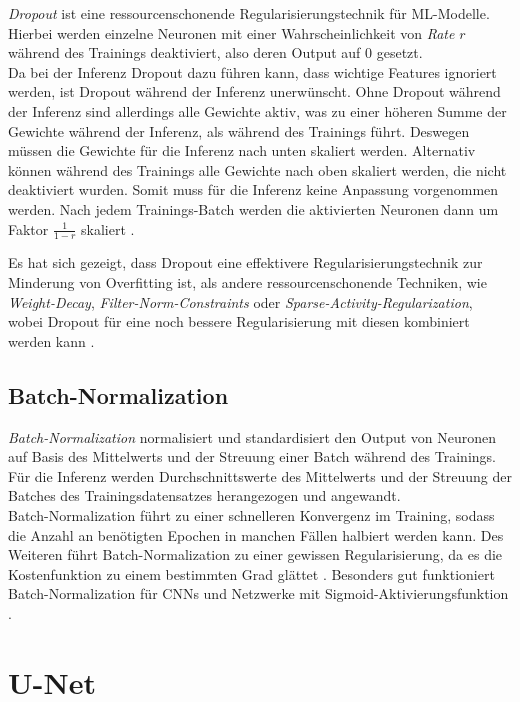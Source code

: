 \textit{Dropout} ist eine ressourcenschonende Regularisierungstechnik für \ac{ML}-Modelle. 
Hierbei werden einzelne Neuronen mit einer Wahrscheinlichkeit von \textit{Rate} $r$ während des Trainings 
deaktiviert, also deren Output auf $0$ gesetzt.\\ 
Da bei der Inferenz Dropout dazu führen kann, 
dass wichtige Features ignoriert werden, ist Dropout während der Inferenz unerwünscht. Ohne Dropout während der 
Inferenz sind allerdings alle Gewichte aktiv, was zu einer höheren Summe der Gewichte während der Inferenz, 
als während des Trainings führt. Deswegen müssen die Gewichte für die Inferenz nach unten skaliert werden. 
Alternativ können während des Trainings alle Gewichte nach oben skaliert werden, die nicht deaktiviert wurden. 
Somit muss für die Inferenz keine Anpassung vorgenommen werden. Nach jedem Trainings-Batch werden die aktivierten 
Neuronen dann um Faktor $\frac{1}{1-r}$ skaliert \cites{Goodfellow.2016}{NitishSrivastava.2014}.

Es hat sich gezeigt, dass Dropout eine effektivere Regularisierungstechnik zur Minderung von Overfitting ist, 
als andere ressourcenschonende Techniken, wie \textit{Weight-Decay}, \textit{Filter-Norm-Constraints} oder 
\textit{Sparse-Activity-Regularization}, wobei Dropout für eine noch bessere Regularisierung mit diesen kombiniert werden kann \cites{Goodfellow.2016}.

\subsection{Batch-Normalization} \label{sec:architekturkomponenten:batchnorm}

\textit{Batch-Normalization} normalisiert und standardisiert den Output von Neuronen auf Basis des Mittelwerts 
und der Streuung einer Batch während des Trainings. Für die Inferenz werden Durchschnittswerte 
des Mittelwerts und der Streuung der Batches des Trainingsdatensatzes herangezogen und angewandt. \\
Batch-Normalization führt zu einer schnelleren Konvergenz im Training, 
sodass die Anzahl an benötigten Epochen in manchen Fällen halbiert werden kann. Des Weiteren führt 
Batch-Normalization zu einer gewissen Regularisierung, da es die Kostenfunktion zu einem bestimmten Grad glättet 
\cites{Goodfellow.2016}{Ioffe.11022015}.
Besonders gut funktioniert Batch-Normalization für \acp{CNN} und Netzwerke mit Sigmoid-Aktivierungsfunktion
\cites{Goodfellow.2016}.

\section{U-Net} \label{sec:architekturkomponenten:unet}


